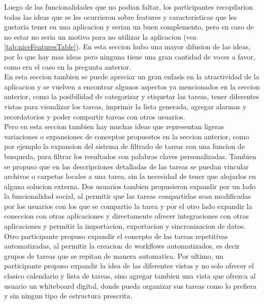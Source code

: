 Luego de las funcionalidades que no podian faltar, los participantes recopilarion todas las ideas que se les ocurrieron sobre features y caracteristicas que les gustaria tener en una aplicacion y serian un buen complemento, pero en caso de no estar no seria un motivo para no utilizar la aplicacion (vea \ref{tab:niceFeaturesTable}). En esta seccion hubo una mayor difusion de las ideas, por lo que hay mas ideas pero ninguna tiene una gran cantidad de voces a favor, como era el caso en la pregunta anterior. \\
En esta seccion tambien se puede apreciar un gran enfasis en la atractividad de la aplicacion y se vuelven a encontrar algunos aspectos ya mencionados en la seccion anterior, como la posibilidad de categorizar y etiquetar las tareas, tener diferentes vistas para visualizar los tareas, imprimir la lista generada, agregar alarmas y recordatorios y poder compartir tareas con otros usuarios. \\
Pero en esta seccion tambien hay muchas ideas que representan ligeras variaciones o expansiones de conceptos propuestos en la seccion anterior, como por ejemplo la expansion del sistema de filtrado de tareas con una funcion de busqueda, para filtrar los resultados con palabras claves personalizadas. Tambien se propuso que en las descripciones detalladas de las tareas se puedan vincular archivos o carpetas locales a una tarea, sin la necesidad de tener que alojarlos en alguna solucion externa. Dos usuarios tambien propusieron expandir por un lado la funcionalidad social, al permitir que las tareas compartidas sean modificadas por los usuarios con los que se compartio la tarea y por el otro lado expandir la coneccion con otras aplicaciones y directamente ofrecer integraciones con otras aplicaciones y permitir la importacion, exportacion y sincronizacion de datos. Otro participante propuso expandir el concepto de las tareas repetitivas automatizadas, al permitir la creacion de workflows automatizados, es decir grupos de tareas que se repitan de manera automatica. Por ultimo, un participante propuso expandir la idea de las diferentes vistas y no solo ofrecer el clasico calendario y lista de tareas, sino agregar tambien una vista que ofrezca al usuario un whiteboard digital, donde pueda organizar sus tareas como lo prefiera y sin ningun tipo de estructura prescrita.\\
